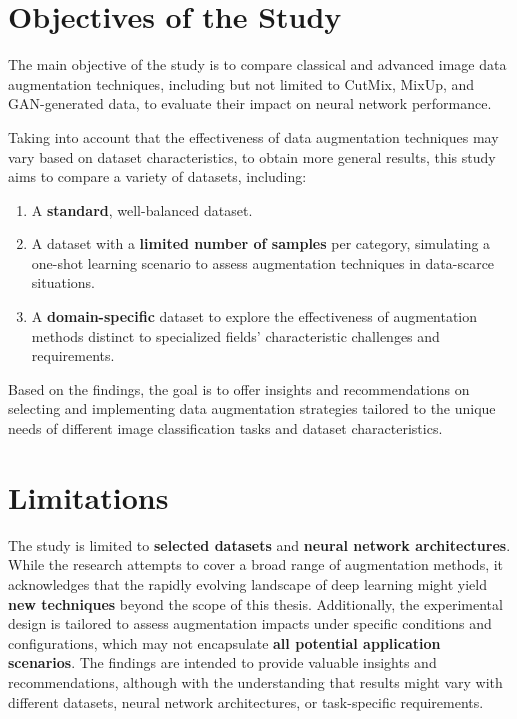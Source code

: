 
\section{Objectives of the Study}
\label{sec:objectives}

The main objective of the study is to compare classical and advanced image data augmentation techniques, including but not limited to CutMix, MixUp, and GAN-generated data, to evaluate their impact on neural network performance.

Taking into account  that the effectiveness of data augmentation techniques may vary based on dataset characteristics, to obtain more general results, this study aims to compare a variety of datasets, including:
\begin{enumerate}
    \item A \textbf{standard}, well-balanced dataset.
    \item A dataset with a \textbf{limited number of samples} per category, simulating a one-shot learning scenario to assess augmentation techniques in data-scarce situations.
    \item A \textbf{domain-specific} dataset to explore the effectiveness of augmentation methods distinct to specialized fields' characteristic challenges and requirements.
\end{enumerate}

Based on the findings, the goal is to offer insights and recommendations on selecting and implementing data augmentation strategies tailored to the unique needs of different image classification tasks and dataset characteristics.


\section{Limitations}
\label{sec:scope}

The study is limited to \textbf{selected datasets} and \textbf{neural network architectures}. While the research attempts to cover a broad range of augmentation methods, it acknowledges that the rapidly evolving landscape of deep learning might yield \textbf{new techniques} beyond the scope of this thesis. Additionally, the experimental design is tailored to assess augmentation impacts under specific conditions and configurations, which may not encapsulate \textbf{all potential application scenarios}. The findings are intended to provide valuable insights and recommendations, although with the understanding that results might vary with different datasets, neural network architectures, or task-specific requirements.


